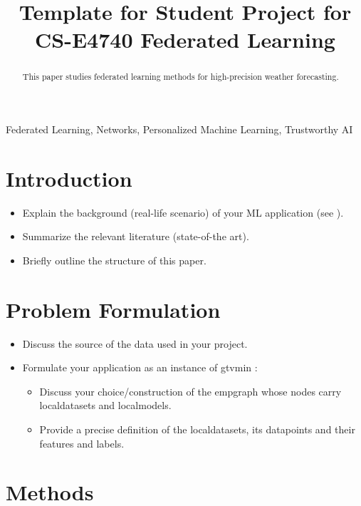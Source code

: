 \documentclass{article}
\title{Template for Student Project for \\ 
	CS-E4740 Federated Learning}
\begin{document}
%
\maketitle


%
\begin{abstract}
This paper studies federated learning methods for high-precision weather forecasting. 
\end{abstract}
%
\begin{keywords}
Federated Learning, Networks, Personalized Machine Learning, Trustworthy AI 
\end{keywords}
%
\section{Introduction}
\label{sec:intro}
\begin{itemize}
\item Explain the background (real-life scenario) of your ML application (see \cite[Ch. 2]{MLBasics}).  
\item Summarize the relevant literature (state-of-the art). 
\item Briefly outline the structure of this paper. 
\end{itemize}


\section{Problem Formulation}
\label{sec:pf}

\begin{itemize} 
\item Discuss the source of the data used in your project. 
\item Formulate your application as an instance of \gls{gtvmin} \cite[Sec. 7]{lecnotesfl}: 
\begin{itemize} 
	\item Discuss your choice/construction of the \gls{empgraph} whose nodes carry \gls{localdataset}s and \gls{localmodel}s. 
	\item Provide a precise definition of the \gls{localdataset}s, its \gls{datapoint}s and their \gls{feature}s and \gls{label}s. 
\end{itemize} 
\end{itemize} 

\section{Methods} 
\label{sec_methods} 
\end{document}
